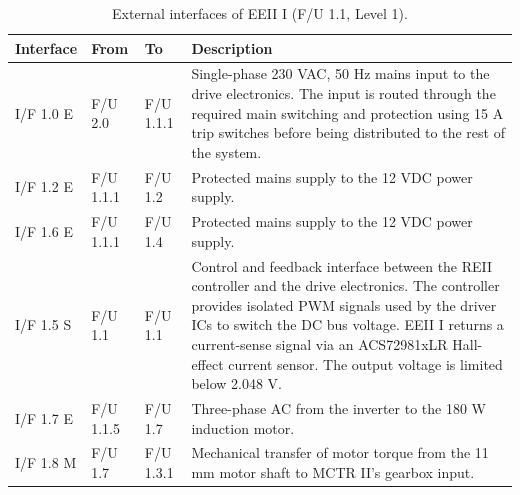 \begin{table}[H]
    \centering
    \caption{External interfaces of EEII I (F/U 1.1, Level 1).}
    \label{tab1:interfaces-eeri1}

    \begin{tabularx}{\textwidth}{@{} l l l X @{}}
        \toprule
        \textbf{Interface} & \textbf{From} & \textbf{To} & \textbf{Description} \\
        \midrule

        I/F 1.0 E & F/U 2.0 & F/U 1.1.1 &
        Single-phase 230 VAC, 50 Hz mains input to the drive electronics. The input is routed through the required main switching and protection using 15 A trip switches before being distributed to the rest of the system. \\

        I/F 1.2 E & F/U 1.1.1 & F/U 1.2 &
        Protected mains supply to the 12 VDC power supply. \\

        I/F 1.6 E & F/U 1.1.1 & F/U 1.4 &
        Protected mains supply to the 12 VDC power supply. \\

        I/F 1.5 S & F/U 1.1 & F/U 1.1 &
        Control and feedback interface between the REII controller and the drive electronics. The controller provides isolated PWM signals used by the driver ICs to switch the DC bus voltage. EEII I returns a current-sense signal via an ACS72981xLR Hall-effect current sensor. The output voltage is limited below 2.048 V. \\

        I/F 1.7 E & F/U 1.1.5 & F/U 1.7 &
        Three-phase AC from the inverter to the 180 W induction motor. \\

        I/F 1.8 M & F/U 1.7 & F/U 1.3.1 &
        Mechanical transfer of motor torque from the 11 mm motor shaft to MCTR II's gearbox input. \\

        \bottomrule
    \end{tabularx}
\end{table}


